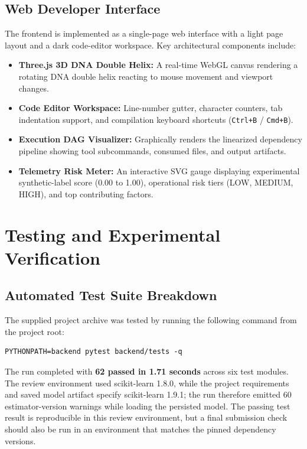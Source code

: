 \documentclass[12pt,a4paper]{article}
\begin{document}
\subsection{Web Developer Interface}

The frontend is implemented as a single-page web interface with a light page layout and a dark code-editor workspace. Key architectural components include:
\begin{itemize}
    \item \textbf{Three.js 3D DNA Double Helix:} A real-time WebGL canvas rendering a rotating DNA double helix reacting to mouse movement and viewport changes.
    \item \textbf{Code Editor Workspace:} Line-number gutter, character counters, tab indentation support, and compilation keyboard shortcuts (\texttt{Ctrl+B} / \texttt{Cmd+B}).
    \item \textbf{Execution DAG Visualizer:} Graphically renders the linearized dependency pipeline showing tool subcommands, consumed files, and output artifacts.
    \item \textbf{Telemetry Risk Meter:} An interactive SVG gauge displaying experimental synthetic-label score (0.00 to 1.00), operational risk tiers (LOW, MEDIUM, HIGH), and top contributing factors.
\end{itemize}

\newpage

\section{Testing and Experimental Verification}

\subsection{Automated Test Suite Breakdown}

The supplied project archive was tested by running the following command from the project root:
\begin{lstlisting}[numbers=none,frame=single,basicstyle=\ttfamily\small]
PYTHONPATH=backend pytest backend/tests -q
\end{lstlisting}
The run completed with \textbf{62 passed in 1.71 seconds} across six test modules. The review environment used scikit-learn 1.8.0, while the project requirements and saved model artifact specify scikit-learn 1.9.1; the run therefore emitted 60 estimator-version warnings while loading the persisted model. The passing test result is reproducible in this review environment, but a final submission check should also be run in an environment that matches the pinned dependency versions.
\end{document}
